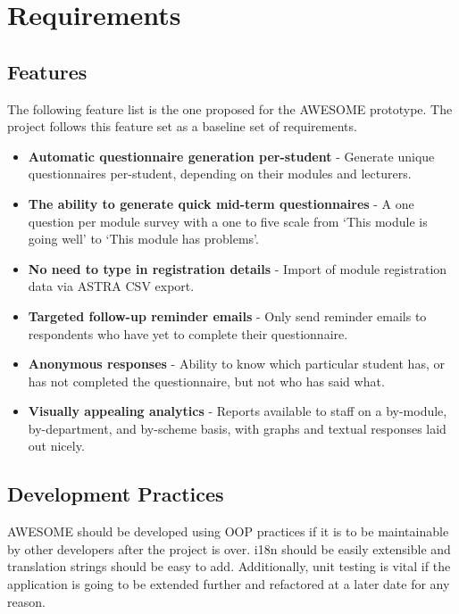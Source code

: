\chapter{Requirements}

	\section{Features}
	\label{sec:features}
	
	The following feature list is the one proposed for the \ac{AWESOME} prototype.
	The project follows this feature set as a baseline set of requirements.
	
	\begin{itemize}
		\item \textbf{Automatic questionnaire generation per-student} - Generate unique questionnaires per-student, depending on their modules and lecturers.
		\item \textbf{The ability to generate quick mid-term questionnaires} - A one question per module survey with a one to five scale from `This module is going well' to `This module has problems'.
		\item \textbf{No need to type in registration details} - Import of module registration data via \ac{ASTRA} \ac{CSV} export.
		\item \textbf{Targeted follow-up reminder emails} - Only send reminder emails to respondents who have yet to complete their questionnaire.
		\item \textbf{Anonymous responses} - Ability to know which particular student has, or has not completed the questionnaire, but not who has said what.
		\item \textbf{Visually appealing analytics} - Reports available to staff on a by-module, by-department, and by-scheme basis, with graphs and textual responses laid out nicely.
	\end{itemize}

	\section{Development Practices}
	
	\ac{AWESOME} should be developed using \ac{OOP} practices if it is to be maintainable by other developers after the project is over.
	\acl{i18n} should be easily extensible and translation strings should be easy to add.
	Additionally, unit testing is vital if the application is going to be extended further and refactored at a later date for any reason.
	
